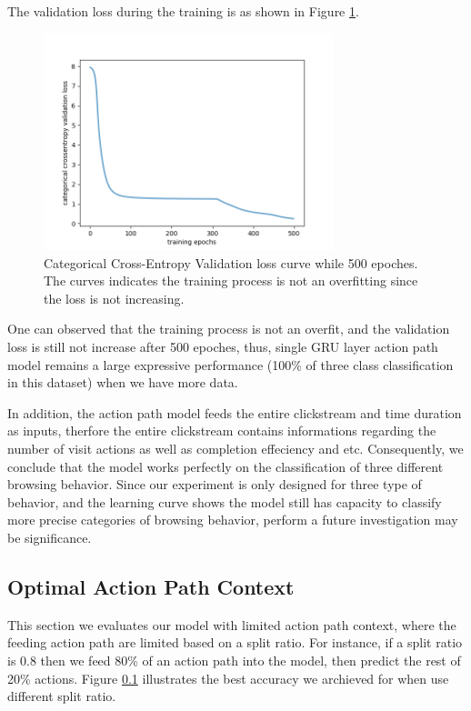 The validation loss during the training is as shown in Figure \ref{fig:class-loss}.

\begin{figure}[H]
    \centering
    \includegraphics[width=0.75\textwidth]{figures/class-loss}
    \caption{Categorical Cross-Entropy Validation loss curve while 500 epoches. 
    The curves indicates the training process is not an overfitting since the loss is not increasing.}
    \label{fig:class-loss}
\end{figure}

One can observed that the training process is not an overfit, and the validation loss is 
still not increase after 500 epoches, thus, single GRU layer action path model 
remains a large expressive performance (100\% of three class classification in this dataset) 
when we have more data.

In addition, the action path model feeds the entire clickstream and time duration as inputs, 
therfore the entire clickstream contains informations regarding the number of visit actions
as well as completion effeciency and etc. Consequently, we conclude that the model works
perfectly on the classification of three different browsing behavior. Since our experiment is
only designed for three type of behavior, and the learning curve
shows the model still has capacity to classify more precise categories of browsing behavior,
perform a future investigation may be significance.

\subsection{Optimal Action Path Context}

This section we evaluates our model with limited action path context, where the feeding action path
are limited based on a split ratio. For instance, if a split ratio is 0.8 then we feed 80\% of 
an action path into the model, then predict the rest of 20\% actions. Figure \ref{} illustrates
the best accuracy we archieved for when use different split ratio.

